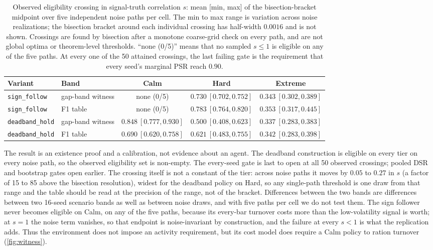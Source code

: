 \begin{table}[t]
\centering
\caption{Observed eligibility crossing in signal-truth correlation $s$: mean [min, max] of the bisection-bracket midpoint over five independent noise paths per cell. The min to max range is variation across noise realizations; the bisection bracket around each individual crossing has half-width $0.0016$ and is not shown. Crossings are found by bisection after a monotone coarse-grid check on every path, and are not global optima or theorem-level thresholds. ``none (0/5)'' means that no sampled $s\le1$ is eligible on any of the five paths. At every one of the 50 attained crossings, the last failing gate is the requirement that every seed's marginal PSR reach $0.90$.}
\label{tab:witness}
\small
\setlength{\tabcolsep}{3.5pt}
\begin{tabular}{llccc}
\toprule
Variant & Band & Calm & Hard & Extreme \\
\midrule
\texttt{sign\_follow} & gap-band witness & none (0/5) & $0.730\ [0.702,0.752]$ & $0.343\ [0.302,0.389]$ \\
\texttt{sign\_follow} & F1 table & none (0/5) & $0.783\ [0.764,0.820]$ & $0.353\ [0.317,0.445]$ \\
\texttt{deadband\_hold} & gap-band witness & $0.848\ [0.777,0.930]$ & $0.500\ [0.408,0.623]$ & $0.337\ [0.283,0.383]$ \\
\texttt{deadband\_hold} & F1 table & $0.690\ [0.620,0.758]$ & $0.621\ [0.483,0.755]$ & $0.342\ [0.283,0.398]$ \\
\bottomrule
\end{tabular}
\end{table}

The result is an existence proof and a calibration, not evidence about an agent. The deadband construction is eligible on every tier on every noise path, so the observed eligibility set is non-empty. The every-seed gate is last to open at all 50 observed crossings; pooled DSR and bootstrap gates open earlier. The crossing itself is not a constant of the tier: across noise paths it moves by $0.05$ to $0.27$ in $s$ (a factor of 15 to 85 above the bisection resolution), widest for the deadband policy on Hard, so any single-path threshold is one draw from that range and the table should be read at the precision of the range, not of the bracket. Differences between the two bands are differences between two 16-seed scenario bands as well as between noise draws, and with five paths per cell we do not test them. The sign follower never becomes eligible on Calm, on any of the five paths, because its every-bar turnover costs more than the low-volatility signal is worth; at $s=1$ the noise term vanishes, so that endpoint is noise-invariant by construction, and the failure at every $s<1$ is what the replication adds. Thus the environment does not impose an activity requirement, but its cost model does require a Calm policy to ration turnover (\cref{fig:witness}).

